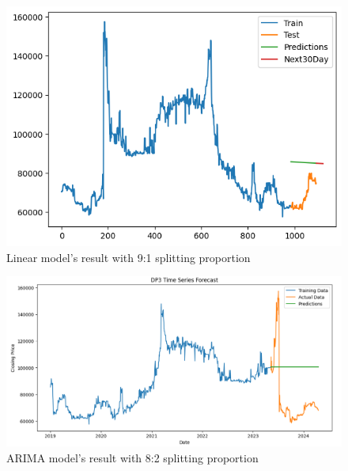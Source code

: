 \documentclass{ieeeojies}
\begin{document}
\begin{figure}[H]
  \centering
  \begin{minipage}{0.8\linewidth}
    \centering
    \includegraphics[width=\linewidth]{bibliography/Figure/LN_DP391.png}
    \caption{Linear model's result with 9:1 splitting proportion}
    \label{fig8}
  \end{minipage}
\end{figure}


\begin{figure}[H]
  \centering
  \begin{minipage}{0.8\linewidth}
    \centering
    \includegraphics[width=\linewidth]{bibliography/Figure/DP3_ARIMA.png}
    \caption{ARIMA model's result with 8:2 splitting proportion}
    \label{fig8}
  \end{minipage}
\end{figure}
\end{document}
